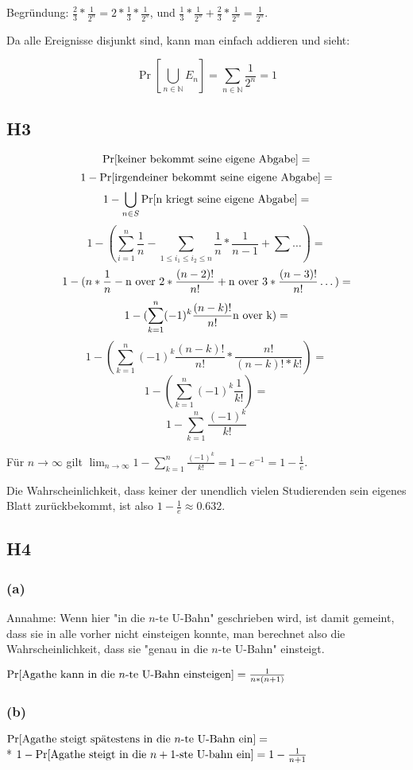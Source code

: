 \documentclass{article}
\begin{document}
Begründung: $\frac{2}{3}*\frac{1}{2^n}=2*\frac{1}{3}*\frac{1}{2^n}$,
und $\frac{1}{3}*\frac{1}{2^n}+\frac{2}{3}*\frac{1}{2^n}=\frac{1}{2^n}$.

Da alle Ereignisse disjunkt sind, kann man einfach addieren und sieht:

$$ \Pr[\bigcup_{n \in \mathbb{N}} E_n] = \sum_{n \in \mathbb{N}} \frac{1}{2^n}=1 $$

\subsection*{H3}

$$ \Pr[\hbox{keiner bekommt seine eigene Abgabe}]= $$
$$ 1-\Pr[\hbox{irgendeiner bekommt seine eigene Abgabe}]= $$
$$ 1-\bigcup_{n \in S} \Pr[\hbox{n kriegt seine eigene Abgabe}]= $$
$$ 1-(\sum_{i=1}^n \frac{1}{n}-\sum_{1 \le i_1 \le i_2 \le n} \frac{1}{n} * \frac{1}{n-1} + \sum \dots)= $$
$$ 1-(n*\frac{1}{n}-\hbox{n over 2}*\frac{(n-2)!}{n!}+\hbox{n over 3}*\frac{(n-3)!}{n!} \dots)= $$
$$ 1-(\sum_{k=1}^{n} (-1)^k \frac{(n-k)!}{n!} \hbox{n over k})= $$
$$ 1-(\sum_{k=1}^{n} (-1)^k \frac{(n-k)!}{n!} * \frac{n!}{(n-k)!*k!})= $$
$$ 1-(\sum_{k=1}^{n} (-1)^k \frac{1}{k!})= $$
$$ 1-\sum_{k=1}^{n} \frac{(-1)^k}{k!} $$

Für $n \rightarrow \infty$ gilt $\lim_{n \rightarrow \infty}
1-\sum_{k=1}^{n} \frac{(-1)^k}{k!}=1-e^{-1}=1-\frac{1}{e} $.

Die Wahrscheinlichkeit, dass keiner der unendlich vielen Studierenden
sein eigenes Blatt zurückbekommt, ist also $1-\frac{1}{e}\approx0.632$.

\subsection*{H4}

\subsubsection*{(a)}

Annahme: Wenn hier "in die $n$-te U-Bahn" geschrieben wird, ist damit
gemeint, dass sie in alle vorher nicht einsteigen konnte, man berechnet
also die Wahrscheinlichkeit, dass sie "genau in die $n$-te U-Bahn"
einsteigt.

$ \Pr[\hbox{Agathe kann in die $n$-te U-Bahn einsteigen}]=\frac{1}{n*(n+1)} $

\subsubsection*{(b)}

$ \Pr[\hbox{Agathe steigt spätestens in die $n$-te U-Bahn ein}]=$\\*
$ 1-\Pr[\hbox{Agathe steigt in die $n+1$-ste U-bahn ein}]=1-\frac{1}{n+1} $
\end{document}
